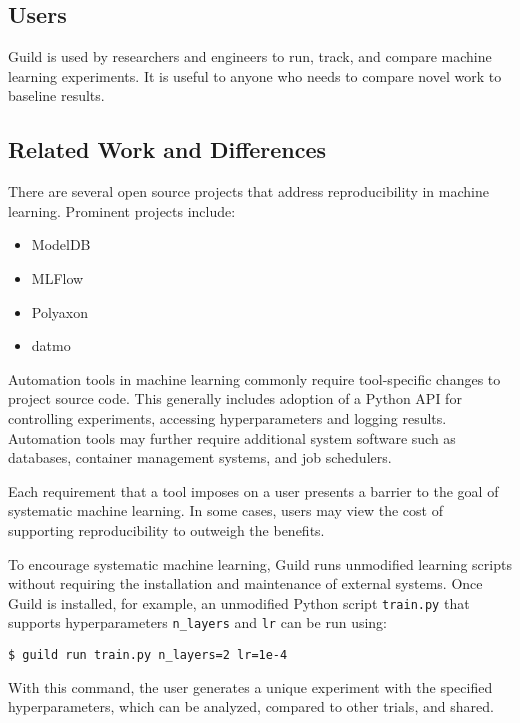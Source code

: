 \documentclass{article}
\begin{document}
\subsection{Users}

Guild is used by researchers and engineers to run, track, and compare
machine learning experiments. It is useful to anyone who needs to
compare novel work to baseline results.

\subsection{Related Work and Differences}

There are several open source projects that address reproducibility in
machine learning. Prominent projects include:

\begin{itemize}[noitemsep, topsep=0pt, partopsep=0pt]
\item ModelDB \cite{modeldb}
\item MLFlow \cite{mlflow}
\item Polyaxon \cite{polyaxon}
\item datmo \cite{datmo}
\end{itemize}

Automation tools in machine learning commonly require tool-specific
changes to project source code. This generally includes adoption of a
Python API for controlling experiments, accessing hyperparameters and
logging results. Automation tools may further require additional
system software such as databases, container management systems, and
job schedulers.

Each requirement that a tool imposes on a user presents a barrier to
the goal of systematic machine learning. In some cases, users may view
the cost of supporting reproducibility to outweigh the benefits.

To encourage systematic machine learning, Guild runs unmodified
learning scripts without requiring the installation and maintenance of
external systems. Once Guild is installed, for example, an unmodified
Python script \texttt{train.py} that supports hyperparameters
\texttt{n\_layers} and \texttt{lr} can be run using:

{\footnotesize
\begin{verbatim}
$ guild run train.py n_layers=2 lr=1e-4
\end{verbatim}}

With this command, the user generates a unique experiment with the
specified hyperparameters, which can be analyzed, compared to other
trials, and shared.
\end{document}
